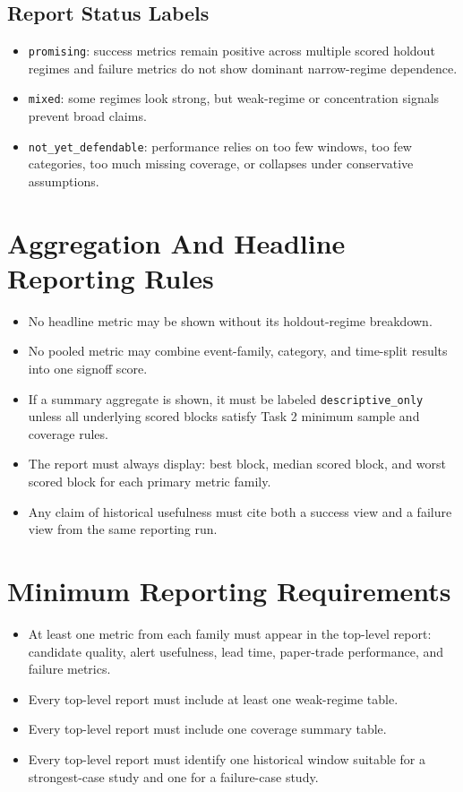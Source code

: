 \documentclass{article}
\begin{document}
\subsection*{Report Status Labels}

\begin{itemize}
\item \texttt{promising}: success metrics remain positive across multiple scored holdout regimes and failure metrics do not show dominant narrow-regime dependence.
\item \texttt{mixed}: some regimes look strong, but weak-regime or concentration signals prevent broad claims.
\item \texttt{not\_yet\_defendable}: performance relies on too few windows, too few categories, too much missing coverage, or collapses under conservative assumptions.
\end{itemize}

\section*{Aggregation And Headline Reporting Rules}

\begin{itemize}
\item No headline metric may be shown without its holdout-regime breakdown.
\item No pooled metric may combine event-family, category, and time-split results into one signoff score.
\item If a summary aggregate is shown, it must be labeled \texttt{descriptive\_only} unless all underlying scored blocks satisfy Task 2 minimum sample and coverage rules.
\item The report must always display:
best block,
median scored block,
and worst scored block
for each primary metric family.
\item Any claim of historical usefulness must cite both a success view and a failure view from the same reporting run.
\end{itemize}

\section*{Minimum Reporting Requirements}

\begin{itemize}
\item At least one metric from each family must appear in the top-level report:
candidate quality,
alert usefulness,
lead time,
paper-trade performance,
and failure metrics.
\item Every top-level report must include at least one weak-regime table.
\item Every top-level report must include one coverage summary table.
\item Every top-level report must identify one historical window suitable for a strongest-case study and one for a failure-case study.
\end{itemize}
\end{document}
